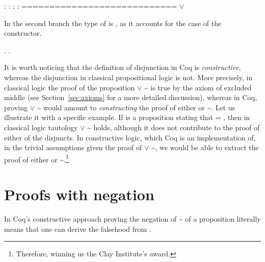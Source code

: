 \coqdoceol
\coqdocemptyline
\coqdocindent{1.00em}
 : \coqdoceol
\coqdocindent{1.00em}
 : \coqdoceol
\coqdocindent{1.00em}
 : \coqdoceol
\coqdocindent{1.00em}
 : \coqdoceol
\coqdocindent{1.00em}
============================\coqdoceol
\coqdocindent{1.50em}
 \ensuremath{\lor} 

\coqdocemptyline


In the second branch the type of  is , as it accounts for the
case of the  constructor.


\begin{coqdoccode}
\coqdocemptyline
\coqdocnoindent
{} .\coqdoceol
\coqdocnoindent
{}.\coqdoceol
\coqdocemptyline
\end{coqdoccode}


It is worth noticing that the definition of disjunction in Coq is
\textit{constructive}, whereas the disjunction in classical propositional
logic is not. More precisely, in classical logic the proof of the
proposition  \ensuremath{\lor} \textasciitilde {} is true by the axiom of excluded middle
(see Section~\ref{sec:axioms} for a more detailed discussion),
whereas in Coq, proving  \ensuremath{\lor} \textasciitilde {} would amount to \textit{constructing} the
proof of either  or \textasciitilde {}. Let us illustrate it with a specific
example. If  is a proposition stating that  = , then in
classical logic tautology  \ensuremath{\lor} \textasciitilde {} holds, although it does not
contribute to the proof of either of the disjuncts. In constructive
logic, which Coq is an implementation of, in the trivial assumptions
given the proof of  \ensuremath{\lor} \textasciitilde {}, we would be able to extract the proof
of either  or \textasciitilde{}.\footnote{Therefore, winning us the Clay
Institute's award.}




\section{Proofs with negation}




In Coq's constructive approach proving the negation of \textasciitilde{} of a
proposition  literally means that one can derive
the falsehood from .


